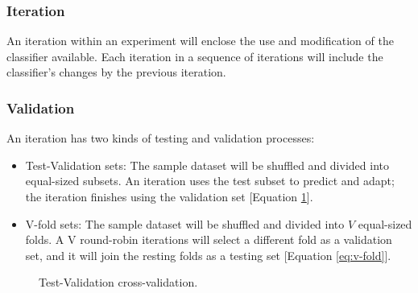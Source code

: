 \documentclass[letterpaper, conference]{IEEEtran}
\begin{document}
\subsubsection{Iteration}
An iteration within an experiment will enclose the use and modification of the classifier available. Each iteration in a sequence of iterations will include the classifier's changes by the previous iteration.

\subsubsection{Validation}
An iteration has two kinds of testing and validation processes:
\begin{itemize}
  \item Test-Validation sets: The sample dataset will be shuffled and divided into equal-sized subsets. An iteration uses the test subset to predict and adapt; the iteration finishes using the validation set [Equation \ref{eq:test-validation}].
  \item V-fold sets: The sample dataset will be shuffled and divided into $V$ equal-sized folds. A V round-robin iterations will select a different fold as a validation set, and it will join the resting folds as a testing set [Equation \ref{eq:v-fold}].
\end{itemize}

\begin{figure}
  \caption{Test-Validation cross-validation.}
  \label{eq:test-validation}
\end{figure}
\end{document}
